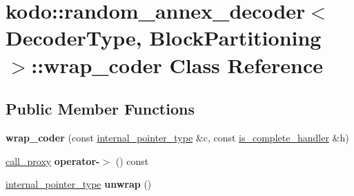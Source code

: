 \hypertarget{classkodo_1_1random__annex__decoder_1_1wrap__coder}{\section{kodo\-:\-:random\-\_\-annex\-\_\-decoder$<$ Decoder\-Type, Block\-Partitioning $>$\-:\-:wrap\-\_\-coder Class Reference}
\label{classkodo_1_1random__annex__decoder_1_1wrap__coder}
}
\subsection*{Public Member Functions}
\begin{DoxyCompactItemize}
\item 
\hypertarget{classkodo_1_1random__annex__decoder_1_1wrap__coder_aa60c6241a63cfee7b95cf896762d1f6a}{{\bfseries wrap\-\_\-coder} (const \hyperlink{classkodo_1_1random__annex__decoder_adbc8e1eb9e3b31cd1461d375cb3e6b2f}{internal\-\_\-pointer\-\_\-type} \&c, const \hyperlink{classkodo_1_1random__annex__decoder_ab4721acd76dbc223b2e46966b543913a}{is\-\_\-complete\-\_\-handler} \&h)}\label{classkodo_1_1random__annex__decoder_1_1wrap__coder_aa60c6241a63cfee7b95cf896762d1f6a}

\item 
\hypertarget{classkodo_1_1random__annex__decoder_1_1wrap__coder_a2d549d25275ae5bd895dcc347f598dbd}{\hyperlink{classkodo_1_1random__annex__decoder_1_1call__proxy}{call\-\_\-proxy} {\bfseries operator-\/$>$} () const }\label{classkodo_1_1random__annex__decoder_1_1wrap__coder_a2d549d25275ae5bd895dcc347f598dbd}

\item 
\hypertarget{classkodo_1_1random__annex__decoder_1_1wrap__coder_afb3143badb89f20261f16f61c8011361}{\hyperlink{classkodo_1_1random__annex__decoder_adbc8e1eb9e3b31cd1461d375cb3e6b2f}{internal\-\_\-pointer\-\_\-type} {\bfseries unwrap} ()}\label{classkodo_1_1random__annex__decoder_1_1wrap__coder_afb3143badb89f20261f16f61c8011361}

\end{DoxyCompactItemize}
